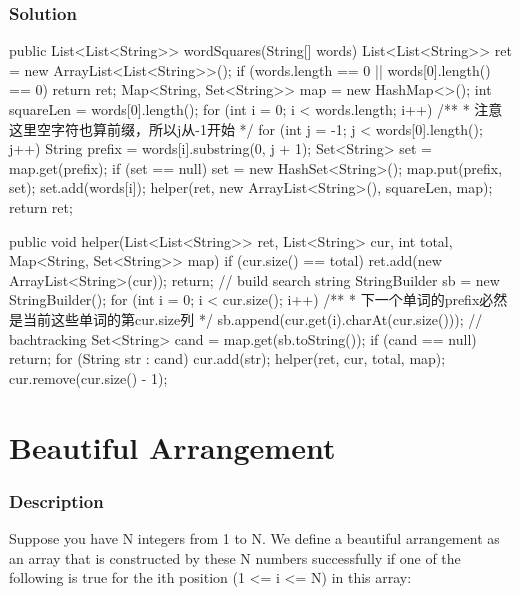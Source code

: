 \subsubsection{Solution}
\begin{Code}
public List<List<String>> wordSquares(String[] words) {
    List<List<String>> ret = new ArrayList<List<String>>();
    if (words.length == 0 || words[0].length() == 0) {
        return ret;
    }
    Map<String, Set<String>> map = new HashMap<>();
    int squareLen = words[0].length();
    for (int i = 0; i < words.length; i++) {
        /**
         * 注意这里空字符也算前缀，所以j从-1开始
         */
        for (int j = -1; j < words[0].length(); j++) {
            String prefix = words[i].substring(0, j + 1);
            Set<String> set = map.get(prefix);
            if (set == null) {
                set = new HashSet<String>();
                map.put(prefix, set);
            }
            set.add(words[i]);
        }
    }
    helper(ret, new ArrayList<String>(), squareLen, map);
    return ret;
}

public void helper(List<List<String>> ret, List<String> cur, int total, Map<String, Set<String>> map) {
    if (cur.size() == total) {
        ret.add(new ArrayList<String>(cur));
        return;
    }
    // build search string
    StringBuilder sb = new StringBuilder();
    for (int i = 0; i < cur.size(); i++) {
        /**
         * 下一个单词的prefix必然是当前这些单词的第cur.size列
         */
        sb.append(cur.get(i).charAt(cur.size()));
    }
    // bachtracking
    Set<String> cand = map.get(sb.toString());
    if (cand == null) {
        return;
    }
    for (String str : cand) {
        cur.add(str);
        helper(ret, cur, total, map);
        cur.remove(cur.size() - 1);
    }
}
\end{Code}

\newpage

\section{Beautiful Arrangement} %
\subsubsection{Description}

Suppose you have N integers from 1 to N. We define a beautiful arrangement as an array that is constructed by these N numbers successfully if one of the following is true for the ith position (1 <= i <= N) in this array:

